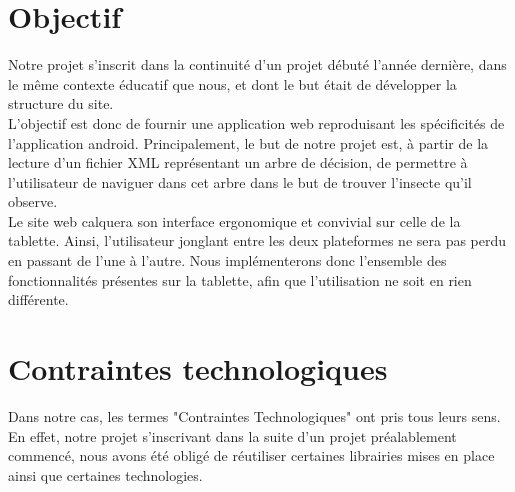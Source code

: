 \documentclass[twoside]{EPURapport}
\begin{document}
	\section{Objectif}
	
	Notre projet s'inscrit dans la continuité d'un projet débuté l'année dernière, dans le même contexte éducatif que nous, et dont le but était de développer la structure du site.\\
	
	L'objectif est donc de fournir une application web reproduisant les spécificités de l'application android. Principalement, le but de notre projet est, à partir de la lecture d'un fichier XML représentant un arbre de décision, de permettre à l'utilisateur  de naviguer dans cet arbre dans le but de trouver l'insecte qu'il observe.\\
	
	Le site web calquera son interface ergonomique et convivial sur celle de la tablette. Ainsi, l'utilisateur jonglant entre les deux plateformes ne sera pas perdu en passant de l'une à l'autre. Nous implémenterons donc l'ensemble des fonctionnalités présentes sur la tablette, afin que l'utilisation ne soit en rien différente.

	\section{Contraintes technologiques}
	
	Dans notre cas, les termes "Contraintes Technologiques" ont pris tous leurs sens. En effet, notre projet s'inscrivant dans la suite d'un projet préalablement commencé, nous avons été obligé de réutiliser certaines librairies mises en place ainsi que certaines technologies.\\
\end{document}

